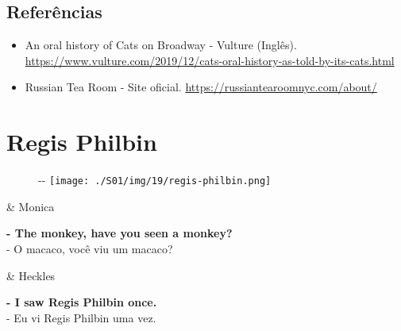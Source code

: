 \hypertarget{referuxeancias-2}{%
\subsection{Referências}\label{referuxeancias-2}}

\begin{itemize}
\tightlist
\item
  \sloppy An oral history of Cats on Broadway - Vulture (Inglês). \url{https://www.vulture.com/2019/12/cats-oral-history-as-told-by-its-cats.html}
\item
  \sloppy Russian Tea Room - Site oficial. \url{https://russiantearoomnyc.com/about/}
\end{itemize}

\hypertarget{regis-philbin}{%
\section{Regis Philbin}\label{regis-philbin}}

\begin{figure}[!ht]
  \begin{adjustwidth}{-\oddsidemargin-1in}{-\rightmargin}
    \centering
    \texttt{[image: ./S01/img/19/regis-philbin.png]}
  \end{adjustwidth}
\end{figure}

\begin{tcolorbox}[enhanced,center upper,
    drop fuzzy shadow southeast, boxrule=0.3pt,
    lower separated=false, breakable,
    colframe=black!30!dialogoBorder,colback=white]
\begin{minipage}[c]{0.16\linewidth}
   & \centering \scriptsize{Monica}
\end{minipage}
\hfill
\begin{minipage}[c]{0.8\linewidth}
  \textbf{- The monkey, have you seen a monkey?}\\
  - O macaco, você viu um macaco?
\end{minipage}

\medskip
\begin{minipage}[c]{0.16\linewidth}
   & \centering \scriptsize{Heckles}
\end{minipage}
\hfill
\begin{minipage}[c]{0.8\linewidth}
  \textbf{- I saw Regis Philbin once.}\\
  - Eu vi Regis Philbin uma vez.
\end{minipage}
\end{tcolorbox}

